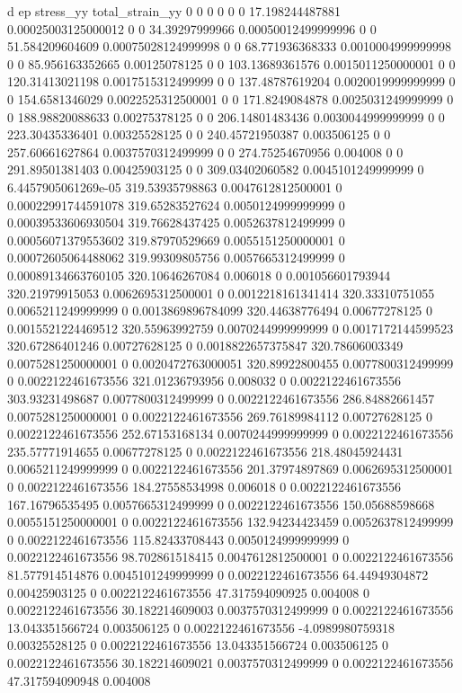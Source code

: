 d ep stress_yy total_strain_yy
0 0 0 0
0 0 17.198244487881 0.00025003125000012
0 0 34.39297999966 0.00050012499999996
0 0 51.584209604609 0.00075028124999998
0 0 68.771936368333 0.0010004999999998
0 0 85.956163352665 0.00125078125
0 0 103.13689361576 0.0015011250000001
0 0 120.31413021198 0.0017515312499999
0 0 137.48787619204 0.0020019999999999
0 0 154.6581346029 0.0022525312500001
0 0 171.8249084878 0.0025031249999999
0 0 188.98820088633 0.00275378125
0 0 206.14801483436 0.0030044999999999
0 0 223.30435336401 0.00325528125
0 0 240.45721950387 0.003506125
0 0 257.60661627864 0.0037570312499999
0 0 274.75254670956 0.004008
0 0 291.89501381403 0.00425903125
0 0 309.03402060582 0.0045101249999999
0 6.4457905061269e-05 319.53935798863 0.0047612812500001
0 0.00022991744591078 319.65283527624 0.0050124999999999
0 0.00039533606930504 319.76628437425 0.0052637812499999
0 0.00056071379553602 319.87970529669 0.0055151250000001
0 0.00072605064488062 319.99309805756 0.0057665312499999
0 0.00089134663760105 320.10646267084 0.006018
0 0.001056601793944 320.21979915053 0.0062695312500001
0 0.0012218161341414 320.33310751055 0.0065211249999999
0 0.0013869896784099 320.44638776494 0.00677278125
0 0.0015521224469512 320.55963992759 0.0070244999999999
0 0.0017172144599523 320.67286401246 0.00727628125
0 0.0018822657375847 320.78606003349 0.0075281250000001
0 0.0020472763000051 320.89922800455 0.0077800312499999
0 0.0022122461673556 321.01236793956 0.008032
0 0.0022122461673556 303.93231498687 0.0077800312499999
0 0.0022122461673556 286.84882661457 0.0075281250000001
0 0.0022122461673556 269.76189984112 0.00727628125
0 0.0022122461673556 252.67153168134 0.0070244999999999
0 0.0022122461673556 235.57771914655 0.00677278125
0 0.0022122461673556 218.48045924431 0.0065211249999999
0 0.0022122461673556 201.37974897869 0.0062695312500001
0 0.0022122461673556 184.27558534998 0.006018
0 0.0022122461673556 167.16796535495 0.0057665312499999
0 0.0022122461673556 150.05688598668 0.0055151250000001
0 0.0022122461673556 132.94234423459 0.0052637812499999
0 0.0022122461673556 115.82433708443 0.0050124999999999
0 0.0022122461673556 98.702861518415 0.0047612812500001
0 0.0022122461673556 81.577914514876 0.0045101249999999
0 0.0022122461673556 64.44949304872 0.00425903125
0 0.0022122461673556 47.317594090925 0.004008
0 0.0022122461673556 30.182214609003 0.0037570312499999
0 0.0022122461673556 13.043351566724 0.003506125
0 0.0022122461673556 -4.0989980759318 0.00325528125
0 0.0022122461673556 13.043351566724 0.003506125
0 0.0022122461673556 30.182214609021 0.0037570312499999
0 0.0022122461673556 47.317594090948 0.004008
